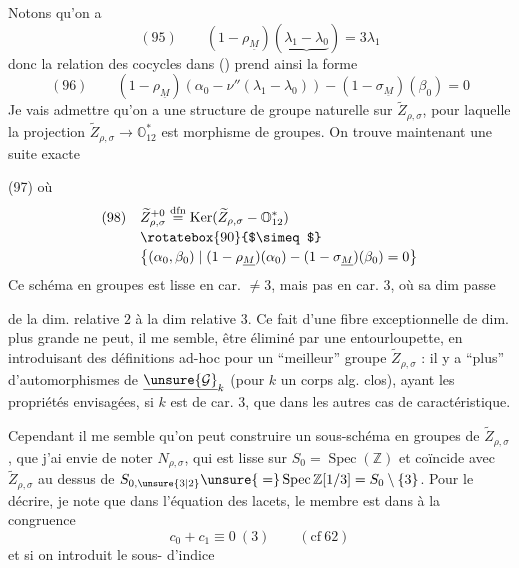 Notons qu'on a
\[
(95)\qquad (1-\rho_{\underline M})
(\underbrace{\lambda_1-\lambda_0})=3\lambda_1
\]
donc la relation des cocycles dans ()
prend ainsi la forme
\[
(96)\qquad
(1-\rho_{\underline M})(\alpha_0-\nu''(\lambda_1-\lambda_0))
-(1-\sigma_{\underline M})(\beta_0)=0
\]
Je vais admettre  qu'on a une structure de groupe naturelle sur
$\widetilde Z_{\rho,\sigma}$, pour laquelle la projection
$\widetilde Z_{\rho,\sigma}\to\mathbb O_{12}^{*}$
est morphisme de groupes. On trouve maintenant une suite exacte

(97)
où
\[
\begin{aligned}
(98)\quad&\widetilde Z_{\rho,\sigma}^{+0}
\overset{\mathrm{dfn}}=\operatorname{Ker}
(\widetilde Z_{\rho,\sigma}\mathbin{-}\mathbb O_{12}^{*})\\[-2pt]
&\rotatebox{90}{$\simeq$}\\[-2pt]
&\bigl\{(\alpha_0,\beta_0)\mid
(1-\rho_{\underline M})(\alpha_0)-(1-\sigma_{\underline M})(\beta_0)=0\bigr\}
\end{aligned}
\]
Ce schéma en groupes est lisse en car. $\ne3$, mais pas en car. $3$, où sa dim passe


de la dim. relative $2$ à la dim relative $3$.
Ce fait d'une fibre exceptionnelle de dim. plus grande ne peut, il me semble, être
éliminé par une entourloupette,  en introduisant
 des définitions ad-hoc pour un ``meilleur'' groupe
$\widetilde Z_{\rho,\sigma}$ : il y a ``plus'' d'automorphismes de
$\underline{\unsure{\mathcal G}}_k$ (pour $k$ un
corps alg. clos), ayant les propriétés envisagées, si $k$ est de car. $3$, que dans les autres cas de caractéristique.

Cependant il me semble qu'on peut construire un sous-schéma en groupes
 de $\widetilde Z_{\rho,\sigma}$, que j'ai envie de noter
$N_{\rho,\sigma}$, qui est lisse sur $S_0=\operatorname{Spec}(\mathbb Z)$ et
coïncide avec $\widetilde Z_{\rho,\sigma}$ au dessus de
$S_{0,\unsure{3|2}}\unsure{{}=}\operatorname{Spec}\mathbb Z[1/3]=S_0\setminus\{3\}$.
Pour le décrire, je note que dans l'équation des lacets,
le  membre est
 dans
à la congruence
\[
c_0+c_1\equiv0\ (3)\qquad(\mathrm{cf}\ 62)
\]
et si on introduit le sous- d'indice

